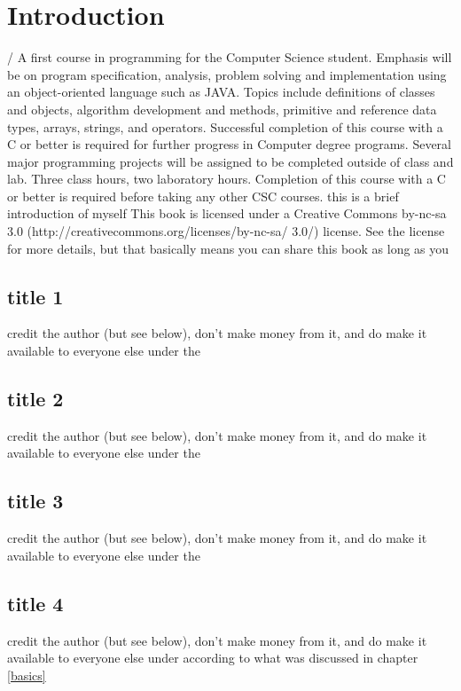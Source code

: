 \documentclass[10pt,a4paper]{article}
\begin{document}
	\section{Introduction}
/	A first course in programming for the Computer Science student. Emphasis will be on program specification, analysis, problem solving and implementation using an object-oriented language such as JAVA. Topics include definitions of classes and objects, algorithm development and methods, primitive and reference data types, arrays, strings, and operators. Successful completion of this course with a C or better is required for further progress in Computer degree programs. Several major programming projects will be assigned to be completed outside of class and lab. Three class hours, two laboratory hours. Completion of this course with a C or better is required before taking any other CSC courses.
	this is a brief introduction of myself
	This book is licensed under a Creative Commons by-nc-sa 3.0 (http://creativecommons.org/licenses/by-nc-sa/
	3.0/) license. See the license for more details, but that basically means you can share this book as long as you
	\subsection{title 1}
	credit the author (but see below), don't make money from it, and do make it available to everyone else under the
	\subsection{title 2}
	credit the author (but see below), don't make money from it, and do make it available to everyone else under the
	\subsection{title 3}
	credit the author (but see below), don't make money from it, and do make it available to everyone else under the
	\subsection{title 4}
	credit the author (but see below), don't make money from it, and do make it available to everyone else under according to what was discussed in chapter \ref{basics}
	
\end{document}

